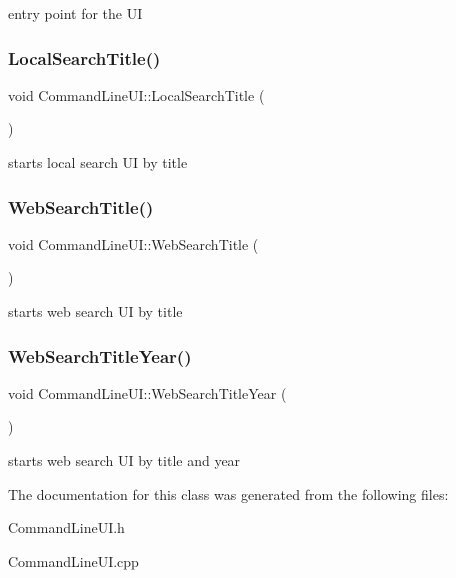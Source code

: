 entry point for the UI \mbox{\label{class_command_line_u_i_aee2e35a46b0e08c2d63e4e560a2ac42e}} 
\subsubsection{\texorpdfstring{Local\+Search\+Title()}{LocalSearchTitle()}}
{\footnotesize\ttfamily void Command\+Line\+U\+I\+::\+Local\+Search\+Title (\begin{DoxyParamCaption}{ }\end{DoxyParamCaption})\hspace{0.3cm}{\ttfamily [static]}}

starts local search UI by title \mbox{\label{class_command_line_u_i_acddc1d1d643322aa7885e758d9ba0258}} 
\subsubsection{\texorpdfstring{Web\+Search\+Title()}{WebSearchTitle()}}
{\footnotesize\ttfamily void Command\+Line\+U\+I\+::\+Web\+Search\+Title (\begin{DoxyParamCaption}{ }\end{DoxyParamCaption})\hspace{0.3cm}{\ttfamily [static]}}

starts web search UI by title \mbox{\label{class_command_line_u_i_a9aadc77fe37d190f9a3931c7babac900}} 
\subsubsection{\texorpdfstring{Web\+Search\+Title\+Year()}{WebSearchTitleYear()}}
{\footnotesize\ttfamily void Command\+Line\+U\+I\+::\+Web\+Search\+Title\+Year (\begin{DoxyParamCaption}{ }\end{DoxyParamCaption})\hspace{0.3cm}{\ttfamily [static]}}

starts web search UI by title and year 

The documentation for this class was generated from the following files\+:\begin{DoxyCompactItemize}
\item 
Command\+Line\+U\+I.\+h\item 
Command\+Line\+U\+I.\+cpp\end{DoxyCompactItemize}

